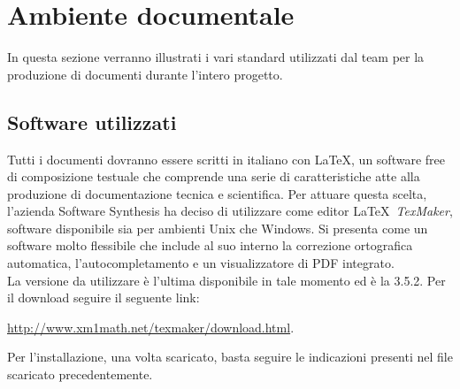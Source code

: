 \newpage
\section{Ambiente documentale}
\label{sec:ambiente_documentale}
In questa sezione verranno illustrati i vari standard utilizzati dal team per la produzione di documenti durante l'intero progetto. 

\subsection{Software utilizzati}
Tutti i documenti dovranno essere scritti in italiano con \LaTeX, un software free di composizione testuale che comprende una serie di caratteristiche atte alla produzione di documentazione tecnica e scientifica.
\newline
Per attuare questa scelta, l'azienda Software Synthesis ha deciso di utilizzare come editor \LaTeX \ \textit{TexMaker}, software disponibile sia per ambienti Unix che Windows. Si presenta come un software molto flessibile che include al suo interno la correzione ortografica automatica, l'autocompletamento e un visualizzatore di PDF integrato.\\
La versione da utilizzare è l'ultima disponibile in tale momento ed è la 3.5.2. Per il download seguire il seguente link:
\begin{center}
\url{http://www.xm1math.net/texmaker/download.html}.
\end{center}
Per l'installazione, una volta scaricato, basta seguire le indicazioni presenti nel file scaricato precedentemente.
